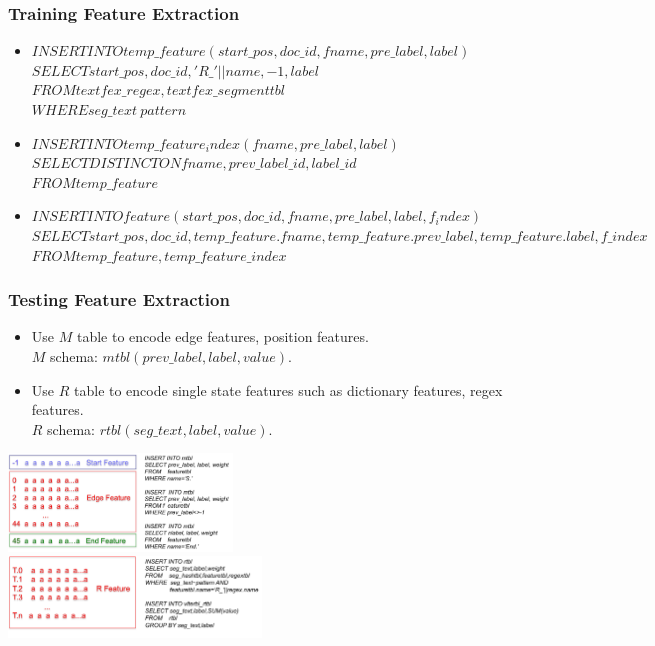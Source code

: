 \documentclass{beamer}
\begin{document}
\begin{frame}
  \frametitle{Training Feature Extraction}
  \begin{itemize}
  \item $INSERT INTO temp\_feature(start\_pos, doc\_id, fname,pre\_label,label)$\\ 
                        $SELECT start\_pos, doc\_id, 'R\_' || name, -1, label$\\
                        $FROM   textfex\_regex, textfex\_segmenttbl$\\
                        $WHERE  seg\_text ~ pattern$\\


  \item $INSERT INTO temp\_feature_index(fname,pre\_label,label)$\\ 
                        $SELECT DISTINCT ON fname, prev\_label\_id, label\_id$\\
                        $FROM   temp\_feature$\\


  \item $INSERT INTO feature(start\_pos, doc\_id, fname,pre\_label,label,f_index)$\\
                        $SELECT start\_pos, doc\_id, temp\_feature.fname, temp\_feature.prev\_label, temp\_feature.label, f\_index$\\
                        $FROM   temp\_feature, temp\_feature\_index$\\
  \end{itemize}
\end{frame}


\begin{frame}
  \frametitle{Testing Feature Extraction}
  \begin{itemize}
  \item Use $M$ table to encode edge features, position features. \\
  $M$ schema: $mtbl(prev\_label,label,value)$.
  \item Use $R$ table to encode single state features such as dictionary features, regex features.\\ 
  $R$ schema: $rtbl(seg\_text,label,value)$. \\
  \end{itemize}
  \includegraphics[height=7.02em]{m.png}\\
  \includegraphics[height=5.85em]{r.png}\\
\end{frame}
\end{document}
